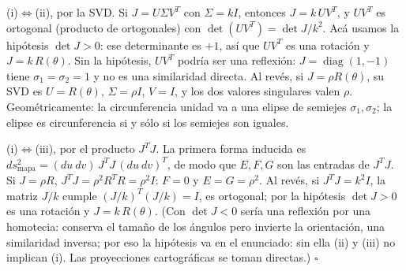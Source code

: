 (i)\(\Leftrightarrow\)(ii), por la SVD. Si \(J=U\Sigma V^T\) con \(\Sigma=kI\), entonces
\(J=k\,UV^T\), y \(UV^T\) es ortogonal (producto de ortogonales) con
\(\det(UV^T)=\det J/k^2\). Acá usamos la hipótesis \(\det J>0\): ese determinante es
\(+1\), así que \(UV^T\) es una rotación y \(J=k\,R(\theta)\). Sin la hipótesis, \(UV^T\)
podría ser una reflexión: \(J=\operatorname{diag}(1,-1)\) tiene \(\sigma_1=\sigma_2=1\) y no
es una similaridad directa. Al revés, si
\(J=\rho R(\theta)\), su SVD es \(U=R(\theta)\), \(\Sigma=\rho I\), \(V=I\), y los dos
valores singulares valen \(\rho\). Geométricamente: la circunferencia unidad va a una
elipse de semiejes \(\sigma_1,\sigma_2\); la elipse es circunferencia si y sólo si los
semiejes son iguales.

(i)\(\Leftrightarrow\)(iii), por el producto \(J^TJ\). La primera forma inducida es
\(ds^2_{\text{mapa}}=(du\ dv)\,J^TJ\,(du\ dv)^T\), de modo que \(E,F,G\) son las
entradas de \(J^TJ\). Si \(J=\rho R\), \(J^TJ=\rho^2R^TR=\rho^2I\): \(F=0\) y
\(E=G=\rho^2\). Al revés, si \(J^TJ=k^2I\), la matriz \(J/k\) cumple \((J/k)^T(J/k)=I\),
es ortogonal; por la hipótesis \(\det J>0\) es una rotación y \(J=k\,R(\theta)\). (Con
\(\det J<0\) sería una reflexión por una homotecia: conserva el tamaño de los ángulos pero
invierte la orientación, una similaridad inversa; por eso la hipótesis va en el enunciado:
sin ella (ii) y (iii) no implican (i). Las proyecciones cartográficas se toman directas.)
\(\square\)

